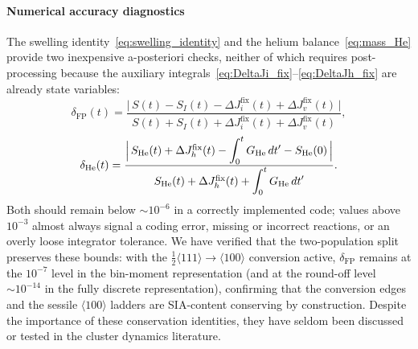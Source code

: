 \paragraph{Numerical accuracy diagnostics}
\label{sec:conservation_check}
The swelling identity~\eqref{eq:swelling_identity} and the helium
balance~\eqref{eq:mass_He} provide two inexpensive a-posteriori checks, neither
of which requires post-processing because the auxiliary
integrals~\eqref{eq:DeltaJi_fix}--\eqref{eq:DeltaJh_fix} are already state
variables:
\begin{equation}\label{eq:delta_FP}
    \delta_{\mathrm{FP}}(t)
    = \frac{\bigl|\,S(t) - S_I(t)
            - \Delta J_i^{\mathrm{fix}}(t)
            + \Delta J_v^{\mathrm{fix}}(t)\,\bigr|}
           {S(t) + S_I(t)
            + \Delta J_i^{\mathrm{fix}}(t)
            + \Delta J_v^{\mathrm{fix}}(t)},
\end{equation}
\begin{equation}\label{eq:delta_He}
    \delta_{\mathrm{He}}(t)
    = \frac{\Bigl|\,
        S_{\mathrm{He}}(t)
        + \Delta J_h^{\mathrm{fix}}(t)
        - \displaystyle\int_0^t G_{\mathrm{He}}\,dt'
        - S_{\mathrm{He}}(0)\,\Bigr|}{
        S_{\mathrm{He}}(t)
        + \Delta J_h^{\mathrm{fix}}(t)
        + \displaystyle\int_0^t G_{\mathrm{He}}\,dt'}.
\end{equation}
Both should remain below $\sim 10^{-6}$ in a correctly implemented code; values
above $10^{-3}$ almost always signal a coding error, missing or incorrect
reactions, or an overly loose integrator tolerance. We have verified that the
two-population split preserves these bounds: with the
$\tfrac12\langle111\rangle\!\to\!\langle100\rangle$ conversion active,
$\delta_{\mathrm{FP}}$ remains at the $10^{-7}$ level in the bin-moment
representation (and at the round-off level $\sim10^{-14}$ in the fully discrete
representation), confirming that the conversion edges and the sessile
$\langle100\rangle$ ladders are SIA-content conserving by construction. Despite
the importance of these conservation identities, they have seldom been discussed
or tested in the cluster dynamics literature.
